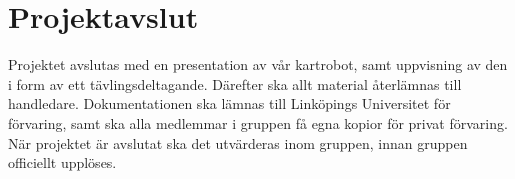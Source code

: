 \documentclass[a4paper,11pt]{article}
\begin{document}
\section{Projektavslut}
Projektet avslutas med en presentation av vår kartrobot, samt uppvisning av den i form av ett tävlingsdeltagande. Därefter ska allt material återlämnas till handledare. Dokumentationen ska lämnas till Linköpings Universitet för förvaring, samt ska alla medlemmar i gruppen få egna kopior för privat förvaring. När projektet är avslutat ska det utvärderas inom gruppen, innan gruppen officiellt upplöses.

\begin{appendices}
\end{appendices}
\clearpage
{}	%
\printbibliography
\end{document}
